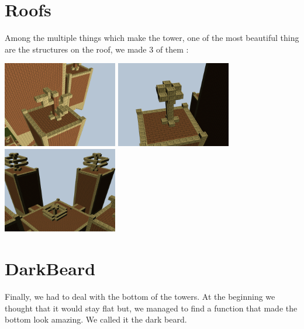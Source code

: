 \documentclass[article]{report}             %
\begin{document}
			\section{Roofs}
				Among the multiple things which make the tower, one of the most beautiful thing are the structures on the roof, we made 3 of them :
				\begin{center}
					\includegraphics[width=5cm]{images/DT/roof1.png}
					\includegraphics[width=5cm]{images/DT/roof2.png}
					\includegraphics[width=5cm]{images/DT/roof3.png}
				\end{center}


			\section{DarkBeard}
				Finally, we had to deal with the bottom of the towers. At the beginning we thought that it would stay flat but, we managed to find a function that made the bottom look amazing. We called it the dark beard.
\end{document}
